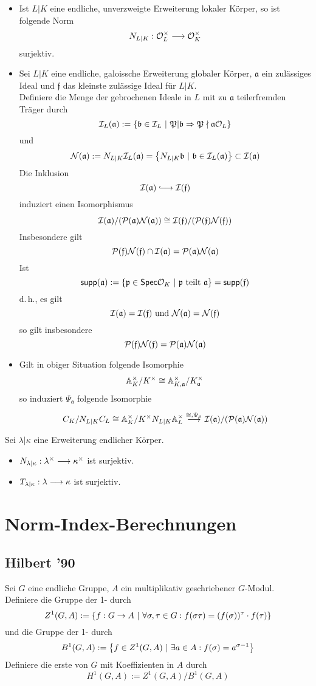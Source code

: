 \documentclass{book}
\renewcommand{\A}{\mathbb{A}}
\newcommand{\Nc}{\mathcal{N}}
\newcommand{\af}{\mathfrak{a}}
\renewcommand{\bf}{\mathfrak{b}}
\newcommand{\ff}{\mathfrak{f}}
\newcommand{\pf}{\mathfrak{p}}
\newcommand{\Pf}{\mathfrak{P}}
\begin{document}
\Satz{}
\begin{itemize}
\item Ist $L|K$ eine endliche, unverzweigte Erweiterung lokaler Körper, so ist folgende Norm
\[ N_{L|K} : \mathcal{O}_L^\times \overset{}{\longrightarrow} \mathcal{O}_K^\times \]
surjektiv.
\item Sei $L|K$ eine endliche, galoissche Erweiterung globaler Körper, $\af$ ein zulässiges Ideal und $\ff$ das kleinste zulässige Ideal für $L|K$.\\
Definiere die Menge der gebrochenen Ideale in $L$ mit zu $\af$ teilerfremden Träger durch
\[ \I_L(\af) := \set{\bf \in \I_L}{ \Pf | \bf \impl{} \Pf \nmid \af\O_L } \]
und
\[ \Nc(\af) := N_{L|K}\I_L(\af) = \set{N_{L|K}\bf}{\bf \in \I_L(\af)} \subset \I(\af) \]
Die Inklusion
\[ \I(\af) \Inj{} \I(\ff) \]
induziert einen Isomorphismus
\[ \I(\af) / (\P(\af) \Nc(\af)) \isom{} \I(\ff) / (\P(\ff) \Nc(\ff)) \]
Insbesondere gilt
\[ \P(\ff) \Nc(\ff) \cap \I(\af) = \P(\af)\Nc(\af) \]
Ist
\[ \textsf{supp}(\af) := \set{\pf \in \textsf{Spec}\O_K }{ \pf \text{ teilt } \af } = \textsf{supp}(\ff)  \]
d.\,h., es gilt
\[ \I(\af) = \I(\ff) \text{ und } \Nc(\af) = \Nc(\ff) \]
so gilt insbesondere
\[ \P(\ff) \Nc(\ff) = \P(\af) \Nc(\af) \]
\item Gilt in obiger Situation folgende Isomorphie
\[ \A_K^\times/K^\times \isom{} \A_{K,\af}^\times/K_\af^\times \]
so induziert $\Psi_\af$ folgende Isomorphie
\[ C_K / N_{L|K}C_L \isom{} \A_K^\times / K^\times N_{L|K}\A_L^\times \Pfeil{\isom{}, \Psi_\af} \I(\af) / (\P(\af) \Nc (\af)) \]
\end{itemize}

\Lem{}
Sei $\lambda | \kappa$ eine Erweiterung endlicher Körper.
\begin{itemize}
\item $N_{\lambda|\kappa} : \lambda^\times \overset{}{\longrightarrow} \kappa^\times$ ist surjektiv.
\item $T_{\lambda|\kappa} : \lambda \overset{}{\longrightarrow} \kappa$ ist surjektiv.
\end{itemize}

\chapter{Norm-Index-Berechnungen}

\section{Hilbert '90}
Sei $G$ eine endliche Gruppe, $A$ ein multiplikativ geschriebener $G$-Modul.\\
Definiere die Gruppe der 1- durch
\[Z^1(G,A) := \{ f : G \overset{}{\rightarrow} A ~|~ \forall  \sigma, \tau \in G: f(\sigma \tau) = (f(\sigma))^\tau \cdot f(\tau) \} \]
und die Gruppe der 1- durch
\[ B^1(G,A) := \set{f \in Z^1(G,A)}{ \exists a \in A: f(\sigma) = a^{\sigma - 1} } \]
Definiere die erste  von $G$ mit Koeffizienten in $A$ durch
\[ H^1(G,A) := Z^1(G,A) / B^1(G,A) \]
\end{document}
